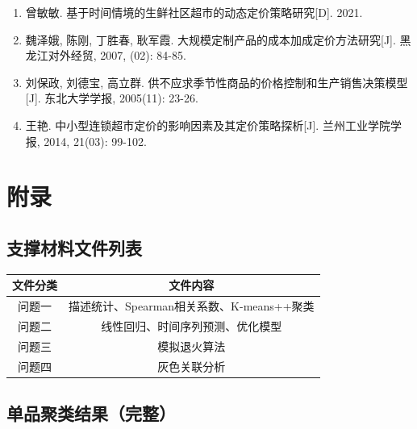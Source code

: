 \documentclass[a4paper,12pt]{article}
\begin{document}
	\begin{enumerate}
		\item 曾敏敏. 基于时间情境的生鲜社区超市的动态定价策略研究[D]. 2021.
		\item 魏泽娥, 陈刚, 丁胜春, 耿军霞. 大规模定制产品的成本加成定价方法研究[J]. 黑龙江对外经贸, 2007, (02): 84-85.
		\item 刘保政, 刘德宝, 高立群. 供不应求季节性商品的价格控制和生产销售决策模型[J]. 东北大学学报, 2005(11): 23-26.
		\item 王艳. 中小型连锁超市定价的影响因素及其定价策略探析[J]. 兰州工业学院学报, 2014, 21(03): 99-102.
	\end{enumerate}
	
	\newpage
	
\newpage

	\section{附录}
	
	\subsection{支撑材料文件列表}
	
	\begin{table}[H]
		\centering
		\begin{tabular}{c|c}
			\hline
			\textbf{文件分类} & \textbf{文件内容} \\
			\hline
			问题一 & 描述统计、Spearman相关系数、K-means++聚类 \\
			问题二 & 线性回归、时间序列预测、优化模型 \\
			问题三 & 模拟退火算法 \\
			问题四 & 灰色关联分析 \\
			\hline
		\end{tabular}
	\end{table}
	
	\subsection{单品聚类结果（完整）}
	
\end{document}
